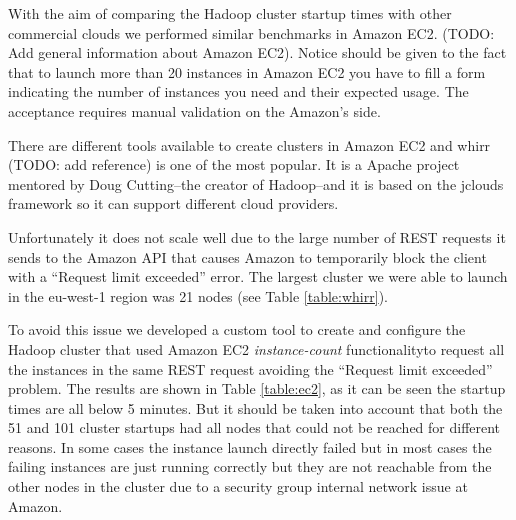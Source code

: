 \documentclass[oribibl]{llncs_Ibergrid2013}
\begin{document}
With the aim of comparing the Hadoop cluster startup times with other commercial clouds we performed similar benchmarks in Amazon EC2. (TODO: Add general information about Amazon EC2). Notice should be given to the fact that to launch more than 20 instances in Amazon EC2 you have to fill a form indicating the number of instances you need and their expected usage. The acceptance requires manual validation on the Amazon's side.

There are different tools available to create clusters in Amazon EC2 and whirr (TODO: add reference) is one of the most popular. It is a Apache project mentored by Doug Cutting--the creator of Hadoop--and it is based on the jclouds framework so it can support different cloud providers.

Unfortunately it does not scale well due to the large number of REST requests it sends to the Amazon API that causes Amazon to temporarily block the client with a ``Request limit exceeded'' error. The largest cluster we were able to launch in the eu-west-1 region was 21 nodes (see Table \ref{table:whirr}).

To avoid this issue we developed a custom tool to create and configure the Hadoop cluster that used Amazon EC2 \emph{instance-count} functionalityto request all the instances in the same REST request avoiding the ``Request limit exceeded'' problem. The results are shown in Table \ref{table:ec2}, as it can be seen the startup times are all below 5 minutes. But it should be taken into account that both the 51 and 101 cluster startups had all nodes that could not be reached for different reasons. In some cases the instance launch directly failed but in most cases the failing instances are just running correctly but they are not reachable from the other nodes in the cluster due to a security group internal network issue at Amazon.
\end{document}
